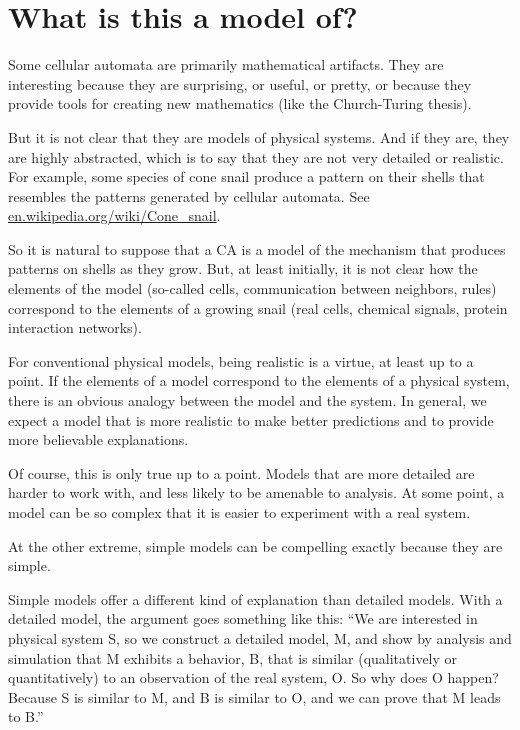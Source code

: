\documentclass[10pt]{book}
\begin{document}
\section{What is this a model of?}

Some cellular automata are primarily mathematical artifacts.
They are interesting because they are surprising, 
or useful, or pretty, or because they provide tools for
creating new mathematics (like the Church-Turing thesis).

But it is not clear that they are models of physical systems.  And if
they are, they are highly abstracted, which is to say that they are
not very detailed or realistic.  For example, some species of cone
snail produce a
pattern on their shells that resembles the patterns generated by
cellular automata.  See \url{en.wikipedia.org/wiki/Cone_snail}.

So it is natural to suppose that a CA is a model of the mechanism that
produces patterns on shells as they grow.  But, at least initially, it
is not clear how the elements of the model (so-called cells,
communication between neighbors, rules) correspond to the elements of
a growing snail (real cells, chemical signals, protein interaction
networks).

For conventional physical models, being realistic is a virtue, at
least up to a point.  If the elements of a model correspond to the
elements of a physical system, there is an obvious analogy between the
model and the system.  In general, we expect a model that is more
realistic to make better predictions and to provide more believable
explanations.

Of course, this is only true up to a point.  Models that are
more detailed are harder to work with, and less likely to be
amenable to analysis.  At some point, a model can be so complex
that it is easier to experiment with a real system.

At the other extreme, simple models can be compelling
exactly because they are simple.  

Simple models offer a different kind of explanation than detailed
models.  With a detailed model, the argument goes something
like this: ``We are interested in physical system S, so we
construct a detailed model, M, and show by analysis and simulation
that M exhibits a behavior, B, that is similar (qualitatively
or quantitatively) to an observation of the real system, O.
So why does O happen?  Because S is similar to M, and
B is similar to O, and we can prove that M leads to B.''
\end{document}
